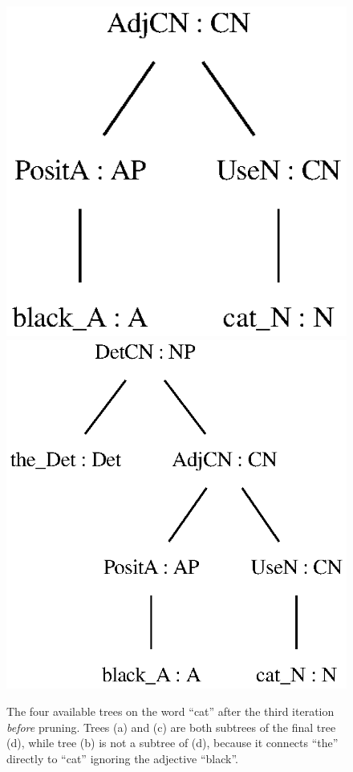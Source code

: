 \begin{figure}
        {\includegraphics[scale=0.6]{figure/black_cats/black_cat_CN_gf.eps}}
        {\includegraphics[scale=0.6]{figure/black_cats/the_black_cat_NP_gf.eps}}
    \caption{The four available trees on the word ``cat'' after the third iteration \emph{before} pruning. Trees (a) and (c) are both subtrees of the final tree (d), while tree (b) is not a subtree of (d), because it connects ``the'' directly to ``cat'' ignoring the adjective ``black''.}\label{fig:cat iter 3}
\end{figure}


